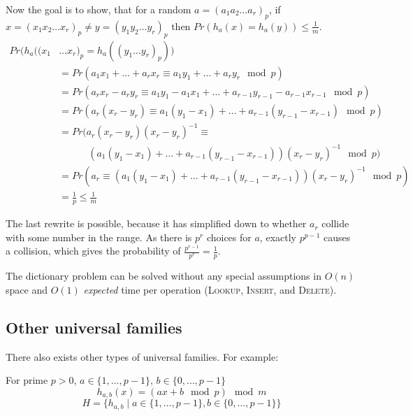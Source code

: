         Now the goal is to show, that for a random $a = (a_1 a_2 \ldots a_r)_p$, if $x = (x_1 x_2 \ldots x_r)_p \not = y = (y_1 y_2 \ldots y_r)_p$ then $Pr(h_a(x) = h_a(y)) \leq \frac{1}{m}$.
        \begin{align*}
            Pr(h_a((x_1 &\ldots x_r)_p = h_a((y_1 \ldots y_r)_p)) \\
            &= Pr(a_1 x_1 + \ldots + a_r x_r \equiv a_1 y_1 + \ldots + a_r y_r \mod p) \\
            &= Pr(a_r x_r - a_r y_r \equiv a_1 y_1 - a_1 x_1 + \ldots + a_{r-1} y_{r - 1} - a_{r-1} x_{r-1} \mod p) \\
            &= Pr(a_r (x_r - y_r) \equiv a_1 (y_1 - x_1) + \ldots + a_{r-1} (y_{r-1} - x_{r-1}) \mod p) \\
            &= Pr(a_r (x_r - y_r)(x_r - y_r)^{-1} \equiv \\
            & \quad \quad \quad (a_1(y_1 - x_1) + \ldots + a_{r-1}(y_{r-1} - x_{r-1}))(x_r - y_r)^{-1} \mod p) \\
            &= Pr(a_r \equiv (a_1 (y_1 - x_1) + \ldots + a_{r-1}(y_{r-1} - x_{r-1}))(x_r - y_r)^{-1} \mod p) \\
            &= \frac{1}{p} \leq \frac{1}{m}
        \end{align*}

        The last rewrite is possible, because it has simplified down to whether $a_r$ collide with some number in the range. As there is $p^r$ choices for $a$, exactly $p^{p-1}$ causes a collision, which gives the probability of $\frac{p^{r-1}}{p^r} = \frac{1}{p}$.

        \begin{theorem}
            The dictionary problem can be solved without any special assumptions in $O(n)$ space and $O(1)$ \emph{expected} time per operation (\textsc{Lookup}, \textsc{Insert}, and \textsc{Delete}).
        \end{theorem}

        \subsection{Other universal families}

            There also exists other types of universal families. For example:

            \begin{definition}
                For prime $p > 0$, $a \in \{1, \ldots, p-1\}$, $b \in \{0, \ldots, p-1\}$
                \[ h_{a,b}(x) = (ax + b \mod p) \mod m \]
                \[ H = \{ h_{a, b} \mid a \in \{1, \ldots, p-1\}, b \in \{0, \ldots, p-1\}\} \]
            \end{definition}

